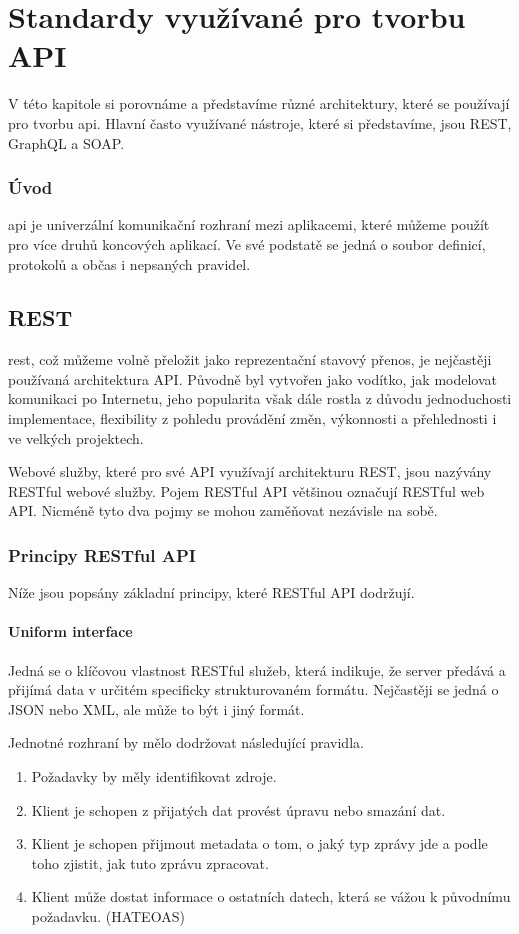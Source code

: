 \chapter{Standardy využívané pro tvorbu API}
V této kapitole si porovnáme a představíme různé architektury, které se používají pro tvorbu \gls{api}.
Hlavní často využívané nástroje, které si představíme, jsou REST, GraphQL a SOAP.

\subsection*{Úvod}
\gls{api} je univerzální komunikační rozhraní mezi aplikacemi, které můžeme použít pro více druhů koncových aplikací. Ve své podstatě se jedná o soubor definicí, protokolů a občas i nepsaných pravidel.


\section{REST}
\gls{rest}, což můžeme volně přeložit jako reprezentační stavový přenos, je nejčastěji používaná architektura API. Původně byl vytvořen jako vodítko, jak modelovat komunikaci po Internetu, jeho popularita však dále rostla z důvodu jednoduchosti implementace, flexibility z pohledu provádění změn, výkonnosti a přehlednosti i ve velkých projektech.

Webové služby, které pro své API využívají architekturu REST, jsou nazývány RESTful webové služby. Pojem RESTful API většinou označují RESTful web API. Nicméně tyto dva pojmy se mohou zaměňovat nezávisle na sobě.


\subsection{Principy RESTful API}

Níže jsou popsány základní principy, které RESTful API dodržují.

\subsubsection*{Uniform interface}
Jedná se o klíčovou vlastnost RESTful služeb, která indikuje, že server předává a přijímá data v určitém specificky strukturovaném formátu. Nejčastěji se jedná o JSON nebo XML, ale může to být i jiný formát.

Jednotné rozhraní by mělo dodržovat následující pravidla.\
\begin{enumerate}
    \item Požadavky by měly identifikovat zdroje.
    \item Klient je schopen z přijatých dat provést úpravu nebo smazání dat.
    \item Klient je schopen přijmout metadata o tom, o jaký typ zprávy jde a podle toho zjistit, jak tuto zprávu zpracovat.
    \item Klient může dostat informace o ostatních datech, která se vážou k původnímu požadavku. (HATEOAS)
\end{enumerate}

